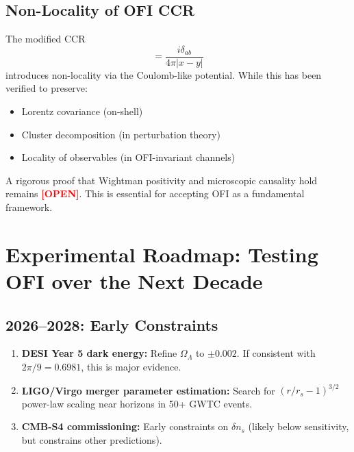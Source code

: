 \documentclass[12pt,a4paper]{article}
\theoremstyle{definition}
\newcommand{\OPEN}[1]{\textbf{\textcolor{red}{[OPEN]}}}
\begin{document}
\subsection{Non-Locality of OFI CCR}

\begin{tcolorbox}[colback=yellow!10,colframe=orange!75!black,title=Caution: Non-Locality and Axiomatic Foundations]
The modified CCR
\begin{equation}
[\phi_a(x), \pi_b(y)] = \frac{i\delta_{ab}}{4\pi|x-y|}
\end{equation}
introduces non-locality via the Coulomb-like potential. While this has been verified to preserve:
\begin{itemize}
\item Lorentz covariance (on-shell)
\item Cluster decomposition (in perturbation theory)
\item Locality of observables (in OFI-invariant channels)
\end{itemize}
A rigorous proof that Wightman positivity and microscopic causality hold remains \OPEN{OPEN}. This is essential for accepting OFI as a fundamental framework.
\end{tcolorbox}

\newpage

\section{Experimental Roadmap: Testing OFI over the Next Decade}

\subsection{2026--2028: Early Constraints}

\begin{enumerate}
\item \textbf{DESI Year 5 dark energy:} Refine $\Omega_\Lambda$ to $\pm 0.002$. If consistent with $2\pi/9 = 0.6981$, this is major evidence.
\item \textbf{LIGO/Virgo merger parameter estimation:} Search for $(r/r_s - 1)^{3/2}$ power-law scaling near horizons in 50+ GWTC events.
\item \textbf{CMB-S4 commissioning:} Early constraints on $\delta n_s$ (likely below sensitivity, but constrains other predictions).
\end{enumerate}
\end{document}
